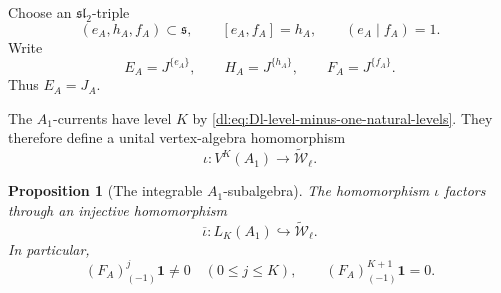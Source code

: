 \documentclass[11pt,reqno]{amsart}
\newtheorem{proposition}[theorem]{Proposition}
\theoremstyle{definition}
\theoremstyle{remark}
\begin{document}
Choose an \(\mathfrak{sl}_2\)-triple
\begin{equation*}
  (e_A,h_A,f_A)
  \subset\mathfrak s,
  \qquad
  [e_A,f_A]=h_A,
  \qquad
  (e_A\mid f_A)=1.
\end{equation*}
Write
\begin{equation*}
  E_A=J^{\{e_A\}},
  \qquad
  H_A=J^{\{h_A\}},
  \qquad
  F_A=J^{\{f_A\}}.
\end{equation*}
Thus \(E_A=J_A\).

The \(A_1\)-currents have level \(K\) by
\eqref{dl:eq:Dl-level-minus-one-natural-levels}.  They therefore define
a unital vertex-algebra homomorphism
\begin{equation*}
  \iota:
  V^K(A_1)
  \longrightarrow
  \widetilde{\mathcal W}_\ell.
\end{equation*}

\begin{proposition}[The integrable \(A_1\)-subalgebra]
\label{dl:prop:Dl-integrable-A1-subalgebra}
The homomorphism \(\iota\) factors through an injective homomorphism
\begin{equation*}
  \overline\iota:
  L_K(A_1)
  \hookrightarrow
  \widetilde{\mathcal W}_\ell.
\end{equation*}
In particular,
\begin{equation}
  (F_A)_{(-1)}^j\mathbf1\ne0
  \quad(0\le j\le K),
  \qquad
  (F_A)_{(-1)}^{K+1}\mathbf1=0.
  \label{dl:eq:Dl-negative-current-string}
\end{equation}
\end{proposition}
\end{document}
